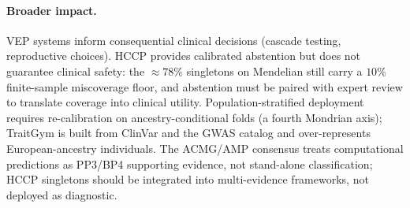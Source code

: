\paragraph{Broader impact.}
VEP systems inform consequential clinical decisions (cascade testing, reproductive choices). HCCP provides calibrated abstention but does not guarantee clinical safety: the $\approx 78\%$ singletons on Mendelian still carry a $10\%$ finite-sample miscoverage floor, and abstention must be paired with expert review to translate coverage into clinical utility. Population-stratified deployment requires re-calibration on ancestry-conditional folds (a fourth Mondrian axis); TraitGym is built from ClinVar and the GWAS catalog and over-represents European-ancestry individuals. The ACMG/AMP consensus \citep{richards2015acmg} treats computational predictions as PP3/BP4 supporting evidence, not stand-alone classification; HCCP singletons should be integrated into multi-evidence frameworks, not deployed as diagnostic.
